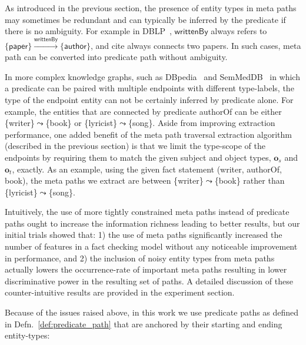 \documentclass[reprint,twocolumn,showpacs,preprintnumbers,amsmath, aps,pre,amssymb]{revtex4-1}
\begin{document}

As introduced in the previous section, the presence of entity types in meta paths may sometimes be redundant and can typically be inferred by the predicate if there is no ambiguity. For example in DBLP~\cite{Ley2009}, $\textsf{writtenBy}$ always refers to $\{\textsf{paper}\}\xrightarrow{\textsf{writtenBy}}\{\textsf{author}\}$, and \textsf{cite} always connects two \textsf{paper}s. In such cases, meta path can be converted into predicate path without ambiguity.

In more complex knowledge graphs, such as DBpedia~\cite{Lehmann2014} and SemMedDB~\cite{Kilicoglu2012} in which a predicate can be paired with multiple endpoints with different type-labels, the type of the endpoint entity can not be certainly inferred by predicate alone. For example, the entities that are connected by predicate \textsf{authorOf} can be either \{\textsf{writer}\}$\leadsto$\{\textsf{book}\} or \{\textsf{lyricist}\}$\leadsto$\{\textsf{song}\}. Aside from improving extraction performance, one added benefit of the meta path traversal extraction algorithm (described in the previous section) is that we limit the type-scope of the endpoints by requiring them to match the given subject and object types, $\mathbf{o}_s$ and $\mathbf{o}_t$, exactly. As an example, using the given fact statement (\textsf{writer}, \textsf{authorOf}, \textsf{book}), the meta paths we extract are between \{\textsf{writer}\}$\leadsto$\{\textsf{book}\} rather than \{\textsf{lyricist}\}$\leadsto$\{\textsf{song}\}.

Intuitively, the use of more tightly constrained meta paths instead of predicate paths ought to increase the information richness leading to better results, but our initial trials showed that: 1) the use of meta paths significantly increased the number of features in a fact checking model without any noticeable improvement in performance, and 2) the inclusion of noisy entity types from meta paths actually lowers the occurrence-rate of important meta paths resulting in lower discriminative power in the resulting set of paths. A detailed discussion of these counter-intuitive results are provided in the experiment section.

Because of the issues raised above, in this work we use predicate paths as defined in Defn.~\ref{def:predicate_path} that are anchored by their starting and ending entity-types:
\end{document}
